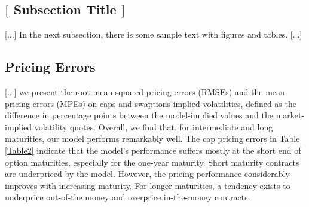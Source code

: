 \documentclass[11pt,a4paper,english,oneside]{book}
\numberwithin{equation}{chapter}
\begin{document}
\subsection{[ Subsection Title ]}

[...] In the next subsection, there is some sample text with figures and tables. [...]




\subsection{Pricing Errors}


[...] we present the root mean squared pricing errors (RMSEs) and the mean pricing errors (MPEs) on caps and swaptions implied volatilities, defined as the difference in percentage points between the model-implied values and the market-implied volatility quotes. Overall, we find that, for intermediate and long maturities, our model performs remarkably well. The cap pricing errors in Table \ref{Table2} indicate that the model's performance suffers mostly at the short end of option maturities, especially for the one-year maturity. Short maturity contracts are underpriced by the model. However, the pricing performance considerably improves with increasing maturity. For longer maturities, a tendency exists to underprice out-of-the money and overprice in-the-money contracts.
\end{document}
